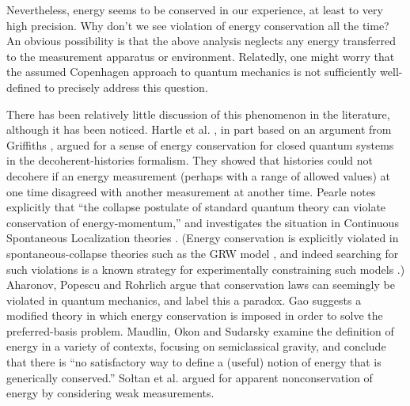 \documentclass[12pt,aps,prd,onecolumn,nofootinbib,notitlepage]{revtex4-1}
\begin{document}
Nevertheless, energy seems to be conserved in our experience, at least to very high precision. 
Why don't we see violation of energy conservation all the time? 
An obvious possibility is that the above analysis neglects any energy transferred to the measurement apparatus or environment. 
Relatedly, one might worry that the assumed Copenhagen approach to quantum mechanics is not sufficiently well-defined to precisely address this question.

There has been relatively little discussion of this phenomenon in the literature, although it has been noticed.
Hartle et al. \cite{hartle1995conservation}, in part based on an argument from Griffiths \cite{griffiths}, argued for a sense of energy conservation for closed quantum systems in the decoherent-histories formalism.
They showed that histories could not decohere if an energy measurement (perhaps with a range of allowed values) at one time disagreed with another measurement at another time.
Pearle \cite{Pearle:2000qb} notes explicitly that ``the collapse postulate of standard quantum theory can violate conservation of energy-momentum,'' and investigates the situation in Continuous Spontaneous Localization theories \cite{Pearle:1988uh,Ghirardi:1989cn}.
(Energy conservation is explicitly violated in spontaneous-collapse theories such as the GRW model \cite{Ghirardi:1985mt}, and indeed searching for such violations is a known strategy for experimentally constraining such models \cite{vinante2016upper}.)
Aharonov, Popescu and Rohrlich  \cite{2016arXiv160905041A} argue that conservation laws can seemingly be violated in quantum mechanics, and label this a paradox.
Gao \cite{Gao:2016cmq} suggests a modified theory in which energy conservation is imposed in order to solve the preferred-basis problem.
Maudlin, Okon and Sudarsky \cite{Maudlin:2019bje} examine the definition of energy in a variety of contexts, focusing on semiclassical gravity, and conclude that there is ``no satisfactory way to define a (useful) notion of energy that is generically conserved.''
So{\l}tan et al. \cite{2019arXiv190706354S} argued for apparent nonconservation of energy by considering weak measurements.
\end{document}
